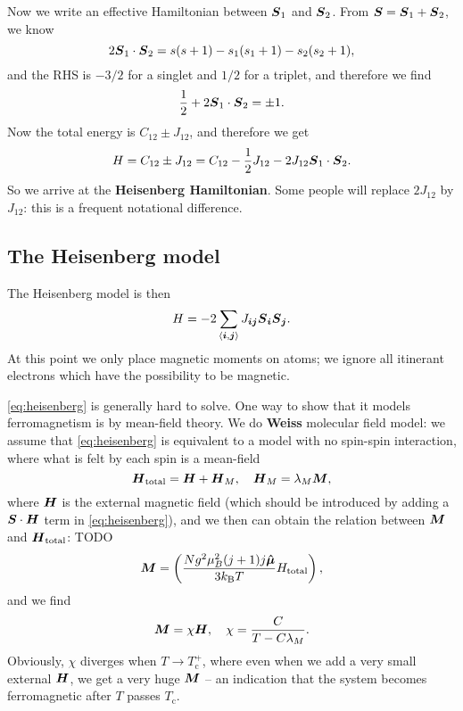 \documentclass[hyperref, a4paper]{article}
\newcommand*{\pair}[1]{\langle #1 \rangle}
\newcommand*{\concept}[1]{{\textbf{#1}}}
\begin{document}
Now we write an effective Hamiltonian between $\vb*{S}_1$ and $\vb*{S}_2$.
From $\vb*{S} = \vb*{S}_1 + \vb*{S}_2$, we know 
\begin{equation}
    2 \vb*{S}_1 \cdot \vb*{S}_2 = 
    s(s+1) - s_1 (s_1 + 1) - s_2 (s_2 + 1),
\end{equation}
and the RHS is $-3/2$ for a singlet and $1/2$ for a triplet,
and therefore we find 
\[
    \frac{1}{2} + 2 \vb*{S}_1 \cdot \vb*{S}_2 = \pm 1.
\]
Now the total energy is $C_{12} \pm J_{12}$,
and therefore we get 
\begin{equation}
    H = C_{12} \pm J_{12} 
    = C_{12} - \frac{1}{2} J_{12} - 2 J_{12} \vb*{S}_1 \cdot \vb*{S}_2.
\end{equation}
So we arrive at the \concept{Heisenberg Hamiltonian}.
Some people will replace $2 J_{12}$ by $J_{12}$:
this is a frequent notational difference.

\subsection{The Heisenberg model}

The Heisenberg model is then 
\begin{equation}
    H = - 2 \sum_{\pair{\vb*{i}, \vb*{j}}} J_{\vb*{i} \vb*{j}} \vb*{S}_{\vb*{i}} \vb*{S}_{\vb*{j}}.
    \label{eq:heisenberg}
\end{equation}
At this point we only place magnetic moments on atoms; 
we ignore all itinerant electrons which have the possibility to be magnetic.

\eqref{eq:heisenberg} is generally hard to solve.
One way to show that it models ferromagnetism is by mean-field theory.
We do \concept{Weiss} molecular field model:
we assume that \eqref{eq:heisenberg} is equivalent to a model with no spin-spin interaction,
where what is felt by each spin is a mean-field 
\begin{equation}
    \vb*{H}_{\text{total}} = \vb*{H} + \vb*{H}_M, \quad 
    \vb*{H}_M = \lambda_M \vb*{M},
\end{equation}
where $\vb*{H}$ is the external magnetic field 
(which should be introduced by adding a $\vb*{S} \cdot \vb*{H}$ term in \eqref{eq:heisenberg}),
and we then can obtain the relation between $\vb*{M}$ and $\vb*{H}_{\text{total}}$:  TODO 
\begin{equation}
    \vb*{M} = \left(
        \frac{N g^2 \mu_B^2 (j+1) j \vu*{\mu}}{3 k_{\text{B}} T} H_{\text{total}}
    \right),
\end{equation}
and we find 
\begin{equation}
    \vb*{M} = \chi \vb*{H}, \quad 
    \chi = \frac{C}{T - C \lambda_M}.
\end{equation}
Obviously, $\chi$ diverges when $T \to T_{\text{c}}^+$,
where even when we add a very small external $\vb*{H}$,
we get a very huge $\vb*{M}$ -- 
an indication that the system becomes ferromagnetic after $T$ passes $T_{\text{c}}$.
\end{document}
